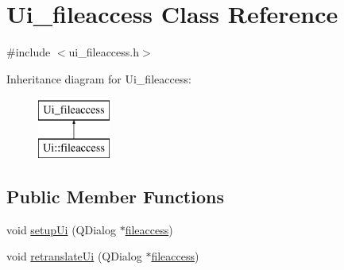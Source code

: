 \hypertarget{classUi__fileaccess}{\section{Ui\-\_\-fileaccess Class Reference}
\label{classUi__fileaccess}
}


{\ttfamily \#include $<$ui\-\_\-fileaccess.\-h$>$}

Inheritance diagram for Ui\-\_\-fileaccess\-:\begin{figure}[H]
\begin{center}
\leavevmode
\includegraphics[height=2.000000cm]{classUi__fileaccess}
\end{center}
\end{figure}
\subsection*{Public Member Functions}
\begin{DoxyCompactItemize}
\item 
void \hyperlink{classUi__fileaccess_a06e4259497511c92299b29afd248035c}{setup\-Ui} (Q\-Dialog $\ast$\hyperlink{classfileaccess}{fileaccess})
\item 
void \hyperlink{classUi__fileaccess_a609305508fda3364814dc8a6516734c0}{retranslate\-Ui} (Q\-Dialog $\ast$\hyperlink{classfileaccess}{fileaccess})
\end{DoxyCompactItemize}
